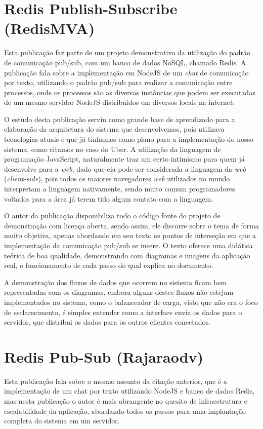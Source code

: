 \section{Redis Publish-Subscribe (RedisMVA) }
Esta publicação \cite{redis-pubsub-redismva} faz parte de um projeto demonstrativo da utilização do padrão de comunicação pub/sub, com um banco de dados NoSQL, chamado Redis. A publicação fala sobre a implementação em NodeJS de um \textit{chat} de comunicação por texto, utilizando o padrão pub/sub para realizar a comunicação entre processos, onde os processos são as diversas instâncias que podem ser executadas de um mesmo servidor NodeJS distribuídos em diversos locais na internet.

O estudo desta publicação serviu como grande base de aprendizado para a elaboração da arquitetura do sistema que desenvolvemos, pois utilizava tecnologias atuais e que já tínhamos como plano para a implementação do nosso sistema, como citamos no caso do Uber. A utilização da linguagem de programação JavaScript, naturalmente traz um certo intimismo para quem já desenvolve para a \textit{web}, dado que ela pode ser considerada a linguagem da \textit{web} (\textit{client-side}), pois todos os maiores navegadores \textit{web} \cite{browsers-usage} utilizados no mundo interpretam a linguagem nativamente, sendo muito comum programadores voltados para a área já terem tido algum contato com a linguagem.

O autor da publicação disponibiliza todo o código fonte do projeto de demonstração com licença aberta, sendo assim, ele discorre sobre o tema de forma muito objetiva, apenas abordando em seu texto os pontos de interseção em que a implementação da comunicação pub/sub se insere. O texto oferece uma didática teórica de boa qualidade, demonstrando com diagramas e imagens da aplicação real, o funcionamento de cada passo do qual explica no documento.

A demonstração dos fluxos de dados que ocorrem no sistema ficam bem representadas com os diagramas, embora alguns destes fluxos não estejam implementados no sistema, como o balanceador de carga, visto que não era o foco de esclarecimento, é simples entender como a interface envia os dados para o servidor, que distribui os dados para os outros clientes conectados.

\section{Redis Pub-Sub (Rajaraodv)}
Esta publicação \cite{redis-pubsub-rajaraodv} fala sobre o mesmo assunto da citação anterior, que é a implementação de um chat por texto utilizando NodeJS e banco de dados Redis, mas nesta publicação o autor é mais abrangente no quesito de infraestrutura e escalabilidade da aplicação, abordando todos os passos para uma implantação completa do sistema em um servidor.

